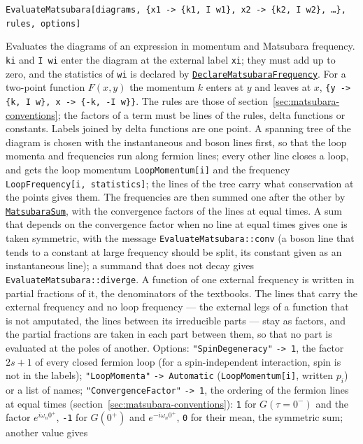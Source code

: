 \documentclass[11pt,a4paper]{article}
\makeatletter
\newcommand{\pkg}[1]{\texttt{#1}}
\newenvironment{function}[1]{\par\if@nobreak\else\medskip\needspace{4\baselineskip}\fi\noindent\phantomsection\label{fn:#1}%
  \begin{fnbox}}{\end{fnbox}\par\nobreak}
\newcommand{\syntax}[1]{\texttt{#1}\par}
\newcommand{\fnref}[1]{\hyperref[fn:#1]{\pkg{#1}}}
\newcommand{\opt}[1]{\texttt{"#1"}}
\makeatother
\begin{document}
\begin{function}{EvaluateMatsubara}
\syntax{EvaluateMatsubara[diagrams, \{x1 -> \{k1, I w1\}, x2 -> \{k2, I w2\}, \dots\}, rules, options]}
\end{function}
Evaluates the diagrams of an expression in momentum and Matsubara frequency. \pkg{ki} and \pkg{I wi} enter the diagram at
the external label \pkg{xi}; they must add up to zero, and the statistics of \pkg{wi} is declared by
\fnref{DeclareMatsubaraFrequency}. For a two-point function $F(x,y)$ the momentum $k$ enters at $y$ and leaves at $x$,
\pkg{\{y -> \{k, I w\}, x -> \{-k, -I w\}\}}. The rules are those of section~\ref{sec:matsubara-conventions}; the factors of
a term must be lines of the rules, delta functions or constants. Labels joined by delta functions are one point. A
spanning tree of the diagram is chosen with the instantaneous and boson lines first, so that the loop momenta and
frequencies run along fermion lines; every other line closes a loop, and gets the loop momentum \pkg{LoopMomentum[i]}
and the frequency \pkg{LoopFrequency[i, statistics]}; the lines of the tree carry what conservation at the points gives
them. The frequencies are then summed one after the other by \fnref{MatsubaraSum}, with the convergence factors of the
lines at equal times. A sum that depends on the convergence factor when no line at equal times gives one is taken
symmetric, with the message \pkg{EvaluateMatsubara::conv} (a boson line that tends to a constant at large frequency
should be split, its constant given as an instantaneous line); a summand that does not decay gives
\pkg{EvaluateMatsubara::diverge}. A function of one external frequency is written in partial fractions of it, the
denominators of the textbooks. The lines that carry the external frequency and no loop frequency --- the external legs
of a function that is not amputated, the lines between its irreducible parts --- stay as factors, and the partial
fractions are taken in each part between them, so that no part is evaluated at the poles of another. Options:
\opt{SpinDegeneracy} \pkg{-> 1}, the factor $2s+1$ of every closed fermion loop (for a spin-independent interaction,
spin is not in the labels); \opt{LoopMomenta} \pkg{-> Automatic} (\pkg{LoopMomentum[i]}, written $p_i$) or a list of
names; \opt{ConvergenceFactor} \pkg{-> 1}, the ordering of the fermion lines at equal times
(section~\ref{sec:matsubara-conventions}): \pkg{1} for $G(\tau=0^-)$ and the factor $e^{i\omega_n0^+}$, \pkg{-1} for
$G(0^+)$ and $e^{-i\omega_n0^+}$, \pkg{0} for their mean, the symmetric sum; another value gives
\end{document}
